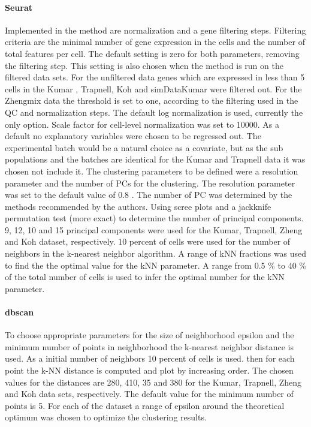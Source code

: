 \documentclass[11pt, a4paper]{article}\usepackage[]{graphicx}\usepackage[]{color}
\begin{document}
\paragraph{Seurat}
Implemented in the method are normalization and a gene filtering steps. Filtering criteria are the minimal number of gene expression in the cells and the number of total features per cell. The default setting is zero for both parameters, removing the filtering step. This setting is also chosen when the method is run on the filtered data sets. For the unfiltered data genes which are expressed in less than 5 cells in the Kumar , Trapnell, Koh and simDataKumar were filtered out. For the Zhengmix data the threshold is set to one, according to the filtering used in the QC and normalization steps.
The default log normalization is used, currently the only option. Scale factor for cell-level normalization was set to 10000. As a default no explanatory variables were chosen to be regressed out. The experimental batch would be a natural choice as a covariate, but as the sub populations and the batches are identical for the Kumar and Trapnell data it was chosen not include it. 
The clustering parameters to be defined were a resolution parameter and the number of PCs for the clustering. The resolution parameter was set to the default value of 0.8 . The number of PC was determined by the methods recommended by the authors. Using scree plots and a jackknife permutation test (more exact) to determine the number of principal components. 9, 12, 10 and 15 principal components were used for the Kumar, Trapnell, Zheng and Koh dataset, respectively.
10 percent of cells were used for the number of neighbors in the k-nearest neighbor algorithm. A range of kNN fractions was used to find the the optimal value for the kNN parameter.  A range from 0.5 \% to 40 \% of the total number of cells is used to infer the optimal number for the kNN parameter.
\paragraph{dbscan}
To choose appropriate parameters for the size of neighborhood epsilon and the minimum number of points in neighborhood the k-nearest neighbor distance is used. As a initial number of neighbors 10 percent of cells is used. then for each point the k-NN distance is computed and plot by increasing order. The chosen values for the distances are 280, 410, 35 and 380 for the Kumar, Trapnell, Zheng and Koh data sets, respectively.
The default value for the minimum number of points is 5.
For each of the dataset a range of epsilon around the theoretical optimum was chosen to optimize the clustering results.
\end{document}
